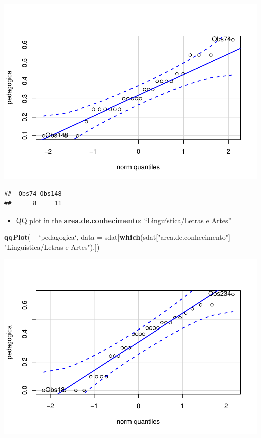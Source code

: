 \documentclass[]{article}
\newenvironment{Shaded}{\begin{snugshade}}{\end{snugshade}}
\newcommand{\DataTypeTok}[1]{\textcolor[rgb]{0.13,0.29,0.53}{#1}}
\newcommand{\KeywordTok}[1]{\textcolor[rgb]{0.13,0.29,0.53}{\textbf{#1}}}
\newcommand{\NormalTok}[1]{#1}
\newcommand{\OperatorTok}[1]{\textcolor[rgb]{0.81,0.36,0.00}{\textbf{#1}}}
\newcommand{\StringTok}[1]{\textcolor[rgb]{0.31,0.60,0.02}{#1}}
\providecommand{\tightlist}{%
  \setlength{\itemsep}{0pt}\setlength{\parskip}{0pt}}
\begin{document}
\includegraphics{factorialAnova_files/figure-latex/unnamed-chunk-31-1.pdf}

\begin{verbatim}
##  Obs74 Obs148 
##      8     11
\end{verbatim}

\begin{itemize}
\tightlist
\item
  QQ plot in the \textbf{area.de.conhecimento}: ``Linguística/Letras e
  Artes''
\end{itemize}

\begin{Shaded}
\begin{Highlighting}[]
\KeywordTok{qqPlot}\NormalTok{( }\OperatorTok{~}\StringTok{ `}\DataTypeTok{pedagogica}\StringTok{`}\NormalTok{, }\DataTypeTok{data =}\NormalTok{ sdat[}\KeywordTok{which}\NormalTok{(sdat[}\StringTok{"area.de.conhecimento"}\NormalTok{] }\OperatorTok{==}\StringTok{ "Linguística/Letras e Artes"}\NormalTok{),])}
\end{Highlighting}
\end{Shaded}

\includegraphics{factorialAnova_files/figure-latex/unnamed-chunk-32-1.pdf}
\end{document}
